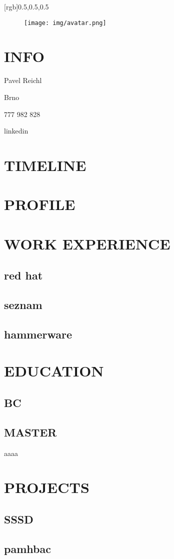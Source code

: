 \documentclass{article}
\begin{document}
\begin{paracol}{2}
[rgb]{0.5,0.5,0.5}

\begin{figure}[h!]
  \texttt{[image: img/avatar.png]}
\end{figure}

\section{INFO}
Pavel Reichl

Brno

777 982 828

linkedin


\section{TIMELINE}

\lipsum[1]

\switchcolumn

\section{PROFILE}

\lipsum[2]

\section{WORK EXPERIENCE}
\subsection{red hat}
\subsection{seznam}
\subsection{hammerware}

\section{EDUCATION}
\subsection{BC}
\subsection{MASTER}

\end{paracol}

aaaa
\section{PROJECTS}

\subsection{SSSD}

\subsection{pamhbac}
\end{document}

